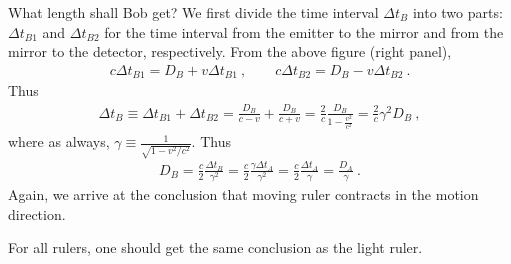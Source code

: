 {{		\item What length shall Bob get? We first divide the time interval $\Delta t_B$ into two parts: $\Delta t_{B1}$ and $\Delta t_{B2}$ for the time interval from the emitter to the mirror and from the mirror to the detector, respectively. From the above figure (right panel),
		\begin{align}
		\label{eq:bobx}
		c\Delta t_{B1} = D_B + v \Delta t_{B1}~, \qquad
		c\Delta t_{B2} = D_B - v \Delta t_{B2}~.
		\end{align}
		Thus
		\begin{align}
		\label{eq:bobt}
		\Delta t_B \equiv \Delta t_{B1} + \Delta t_{B2} = \frac{D_B}{c-v} + \frac{D_B}{c+v} = \frac{2}{c} \frac{D_B}{1-\frac{v^2}{c^2} }
		= \frac{2}{c} \gamma^2 D_B~,
		\end{align}
		where as always, $\gamma\equiv \frac{1}{\sqrt{1-v^2/c^2}} $. Thus
		\begin{align}
		\label{eq:bobalice}
		D_B = \frac{c}{2} \frac{\Delta t_B}{\gamma^2} = \frac{c}{2} \frac{\gamma \Delta t_A}{\gamma^2} 
		= \frac{c}{2} \frac{\Delta t_A}{\gamma} = \frac{D_A}{\gamma}~.    
		\end{align}
		Again, we arrive at the conclusion that moving ruler contracts in the motion direction.

		\item For all rulers, one should get the same conclusion as the light ruler.
	}	
}

